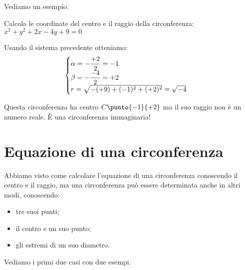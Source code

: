 Vediamo un esempio.

\begin{esempio}
Calcola le coordinate del centro e il raggio della circonferenza:
\(x^2 +y^2 +2x -4y +9 = 0\)

Usando il sistema precedente otteniamo:
\[\begin{cases}\alpha = -\dfrac{+2}{2} = -1\\ 
           \beta = -\dfrac{-4}{2} = +2 \\ 
           r = \sqrt{-(+9) +(-1)^2 + (+2)^2} = \sqrt{-4}\end{cases}\]
           
Questa circonferenza ha centro \(C\punto{-1}{+2}\) ma il suo raggio non è un 
numero reale. È una circonferenza immaginaria!
\end{esempio}

\section{Equazione di una circonferenza}
\label{sec:circ_equazione}

Abbiamo visto come calcolare l'equazione di una circonferenza conoscendo 
il centro e il raggio, ma una circonferenza può essere determinata anche in 
altri modi, conoscendo:

\begin{itemize} [noitemsep]
 \item tre suoi punti;
 \item il centro e un suo punto;
 \item gli estremi di un suo diametro.
\end{itemize}

Vediamo i primi due casi con due esempi.

